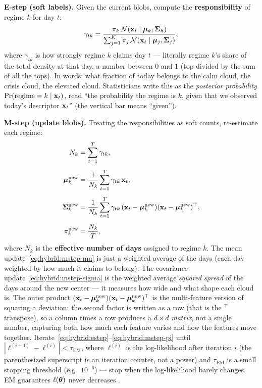 \begin{keyidea}
\textbf{E-step (soft labels).}  Given the current blobs, compute the
\textbf{responsibility} of regime $k$ for day $t$:
\begin{equation}\label{eq:hybrid:estep}
  \gamma_{tk} = \frac{\pi_k\,\mathcal{N}(\mathbf{x}_t \mid \bm{\mu}_k, \bm{\Sigma}_k)}
    {\sum_{j=1}^{K} \pi_j\,\mathcal{N}(\mathbf{x}_t \mid \bm{\mu}_j, \bm{\Sigma}_j)},
\end{equation}
where $\gamma_{tk}$ is how strongly regime $k$ claims day $t$ ---
literally regime $k$'s share of the total density at that day, a number
between $0$ and $1$ (top divided by the sum of all the tops).  In words:
what fraction of today belongs to the calm cloud, the crisis cloud, the
elevated cloud.  Statisticians write this as the \emph{posterior
probability} $\Pr(\text{regime}=k \mid \mathbf{x}_t)$, read ``the probability the
regime is $k$, given that we observed today's descriptor $\mathbf{x}_t$'' (the
vertical bar means ``given'').

\textbf{M-step (update blobs).}  Treating the responsibilities as soft
counts, re-estimate each regime:
\begin{align}
  N_k &= \sum_{t=1}^{T} \gamma_{tk}, \label{eq:hybrid:mstep-n}\\[4pt]
  \bm{\mu}_k^{\text{new}} &= \frac{1}{N_k}
    \sum_{t=1}^{T} \gamma_{tk}\,\mathbf{x}_t, \label{eq:hybrid:mstep-mu}\\[4pt]
  \bm{\Sigma}_k^{\text{new}} &= \frac{1}{N_k}
    \sum_{t=1}^{T} \gamma_{tk}\,(\mathbf{x}_t - \bm{\mu}_k^{\text{new}})
    (\mathbf{x}_t - \bm{\mu}_k^{\text{new}})^\top, \label{eq:hybrid:mstep-sigma}\\[4pt]
  \pi_k^{\text{new}} &= \frac{N_k}{T}, \label{eq:hybrid:mstep-pi}
\end{align}
where $N_k$ is the \textbf{effective number of days} assigned to regime
$k$.  The mean update~\eqref{eq:hybrid:mstep-mu} is just a weighted average
of the days (each day weighted by how much it claims to belong).  The
covariance update~\eqref{eq:hybrid:mstep-sigma} is the weighted average
\emph{squared spread} of the days around the new center --- it measures how
wide and what shape each cloud is.  The outer product
$(\mathbf{x}_t - \bm{\mu}_k^{\text{new}})(\mathbf{x}_t - \bm{\mu}_k^{\text{new}})^\top$ is
the multi-feature version of squaring a deviation: the second factor is
written as a row (that is the $^\top$ transpose), so a column times a row
produces a $d\times d$ \emph{matrix}, not a single number, capturing both
how much each feature varies and how the features move together.
Iterate~\eqref{eq:hybrid:estep}--\eqref{eq:hybrid:mstep-pi} until
$|\ell^{(i+1)} - \ell^{(i)}| < \tau_{\text{EM}}$, where $\ell^{(i)}$ is the
log-likelihood after iteration $i$ (the parenthesized superscript is an
iteration counter, not a power) and $\tau_{\text{EM}}$ is a small stopping
threshold (e.g.\ $10^{-6}$) --- stop when the log-likelihood barely changes.
EM guarantees $\ell(\bm{\theta})$ never decreases
\citep{DempsterLairdRubin1977}.
\end{keyidea}

